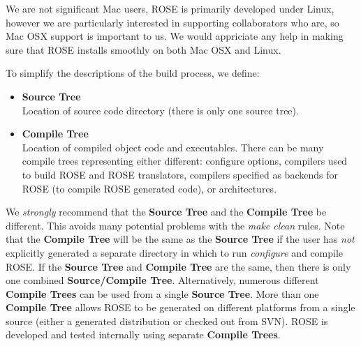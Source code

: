    We are not significant Mac users, ROSE is primarily developed under Linux, 
however we are particularly interested in supporting collaborators who are, 
so Mac OSX support is important to us.  We would appriciate any help in making 
sure that ROSE installs smoothly on both Mac OSX and Linux.



To simplify the descriptions of the build process, we define:
\begin{itemize} 
   \item {\bf Source Tree} \\
         Location of source code directory (there is only one source tree).
   \item {\bf Compile Tree} \\
         Location of compiled object code and executables. There can be many compile trees
         representing either different: configure options, compilers used to build ROSE
         and ROSE translators, compilers specified as backends for ROSE (to compile ROSE
         generated code), or architectures.
\end{itemize}

We {\em strongly} recommend that the {\bf Source Tree} and the {\bf Compile Tree} be
different. This avoids many potential problems with the {\em make clean} rules.
Note that the {\bf Compile Tree} will be the same as the {\bf Source Tree}
if the user has {\em not} explicitly generated a separate directory in which to
run {\em configure} and compile ROSE. If the {\bf Source Tree} and {\bf Compile Tree} 
are the same, then there is only one combined {\bf Source/Compile Tree}.
Alternatively, numerous different {\bf Compile Trees} can be used from 
a single {\bf Source Tree}.  More than one {\bf Compile Tree} allows
ROSE to be generated on different platforms from a single source 
(either a generated distribution or checked out from SVN).  ROSE is developed 
and tested internally using separate {\bf Compile Trees}. \\


